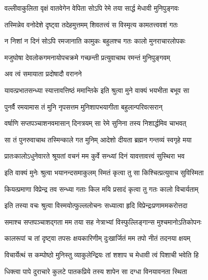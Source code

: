 \twolineshloka
{वल्लीवाकुलिता वृक्षं वातवेगेन वेपिता}
{सोऽपि रेमे तया सार्द्ध मेधावी मुनिपुङ्गवः} %

\twolineshloka
{तस्मिन्नेव वनोदेशे दृष्ट्वा तदेहमुत्तमम्}
{शिवतत्त्वं स विस्मृत्य कामतत्त्ववशं गतः} %

\twolineshloka
{न निशां न दिनं सोऽपि रमजानाति कामुकः}
{बहुलश्च गतः कालो मुनराचारलोपकः} %

\twolineshloka
{मजुघोषा देवलोकगमनायोपचक्रमे}
{गच्छन्ती प्रत्युवाचाथ रमन्तं मुनिपुङ्गवम्} %



\onelineshloka
{अव त्वं समायाता प्रदोषादौ वरानने} %

\twolineshloka
{यावत्प्रभातसन्ध्या स्यात्तावत्तिष्ठं ममान्तिके}
{इति श्रुत्वा मुने वाक्यं भयभीता बभूव सा} %

\twolineshloka
{पुनर्वै रमयामास तं मुनि नृपसत्तम}
{मुनिशापभयागीता बहुलान्परिवत्सरान्} %

\twolineshloka
{वर्षाणि सप्तपञ्चाशनवमासान् दिनत्रयम्}
{सा रेमे सुनिना तस्य निशार्द्धमिव चाभवत्} %

\twolineshloka
{सा तं पुनरुवाचाथ तस्मिन्काले गत मुनिम्}
{आदेशो दीयता ब्रह्मन गन्तव्यं स्वगृहे मया} %


\twolineshloka
{प्रातःकालोऽधुनेवारते श्रूयतां वचनं मम}
{कुर्वे सन्ध्यां दिनं यावत्तावत्त्वं सुस्थिरा भव} %

\twolineshloka
{इति वाक्यं मुनेः श्रुत्वा भयानन्दसमाकुलम्}
{स्मितं कृत्वा तु सा किश्चित्प्रत्युवाच सुविस्मिता} %


\twolineshloka
{कियत्प्रमाणा विप्रेन्द्र तव सन्ध्या गताः किल}
{मयि प्रसादं कृत्वा तु गतः कालो विचार्यताम्} %

\twolineshloka
{इति तस्या वचः श्रुत्वा विस्मयोत्फुल्ललोचनः}
{सध्यात्वा हृदि विप्रेन्द्रःप्रणाममकरोत्तदा} %

\twolineshloka
{समाश्च सप्तपञ्चाशद्गता मम तया सह}
{नेत्राभ्यां विस्फुल्लिङ्गान्स मुश्चमानोऽतिकोपनः} %

\twolineshloka
{कालरूपां च तां दृष्ट्वा तपसः क्षयकारिणीम्}
{दुःखार्जितं मम तपो नीतं तदनया क्षयम्} %

\twolineshloka
{विचार्येत्थं स कम्पोष्ठो मुनिस्तु व्याकुलेन्द्रियः}
{तां शशाप च मेधावी त्वं पिशाची भवेति हि} %

\twolineshloka
{धिक्त्वा पापे दुराचारे कुलटे पातकप्रिये}
{तस्य शापेन सा दग्धा विनयावनता स्थिता} %

